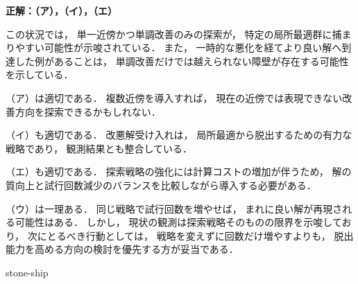 \begin{example}[title={クイズ9 正解・解説}]
\label{ans:heu-multi3-var}
\textbf{正解：（ア），（イ），（エ）}

この状況では，
単一近傍かつ単調改善のみの探索が，
特定の局所最適群に捕まりやすい可能性が示唆されている．
また，
一時的な悪化を経てより良い解へ到達した例があることは，
単調改善だけでは越えられない障壁が存在する可能性を示している．

（ア）は適切である．
複数近傍を導入すれば，
現在の近傍では表現できない改善方向を探索できるかもしれない．

（イ）も適切である．
改悪解受け入れは，
局所最適から脱出するための有力な戦略であり，
観測結果とも整合している．

（エ）も適切である．
探索戦略の強化には計算コストの増加が伴うため，
解の質向上と試行回数減少のバランスを比較しながら導入する必要がある．

（ウ）は一理ある．
同じ戦略で試行回数を増やせば，
まれに良い解が再現される可能性はある．
しかし，
現状の観測は探索戦略そのものの限界を示唆しており，
次にとるべき行動としては，
戦略を変えずに回数だけ増やすよりも，
脱出能力を高める方向の検討を優先する方が妥当である．

\end{example}




 {stone-ship}

